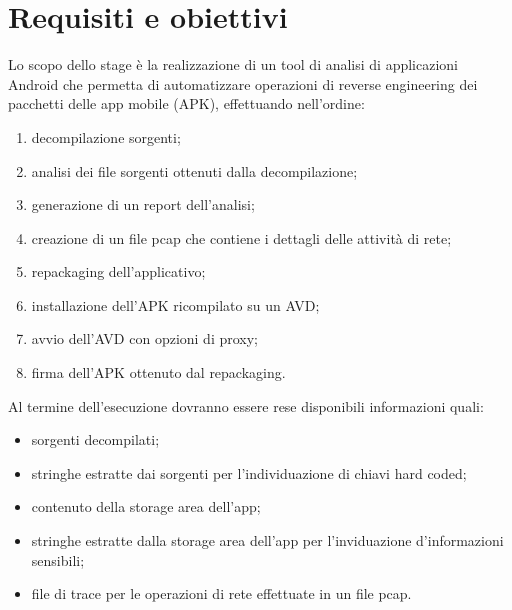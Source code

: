 
\section{Requisiti e obiettivi}\label{sec:requisiti-e-obiettivi}

Lo scopo dello stage è la realizzazione di un tool di analisi di applicazioni Android che permetta di automatizzare operazioni di reverse engineering dei pacchetti delle app mobile (APK), effettuando nell'ordine:
\begin{enumerate}
    \setlength\itemsep{0.1em}
    \item decompilazione sorgenti;
    \item analisi dei file sorgenti ottenuti dalla decompilazione;
    \item generazione di un report dell'analisi;
    \item creazione di un file \gls{pcap} che contiene i dettagli delle attività di rete;
    \item repackaging dell'applicativo;
    \item installazione dell'APK ricompilato su un AVD;
    \item avvio dell'AVD con opzioni di proxy;
    \item firma dell'APK ottenuto dal repackaging.
\end{enumerate}

Al termine dell'esecuzione dovranno essere rese disponibili informazioni quali:
\begin{itemize}
    \setlength\itemsep{0.1em}
    \item sorgenti decompilati;
    \item stringhe estratte dai sorgenti per l'individuazione di chiavi hard coded;
    \item contenuto della storage area dell'app;
    \item stringhe estratte dalla storage area dell'app per l'inviduazione d'informazioni sensibili;
    \item file di trace per le operazioni di rete effettuate in un file pcap.
\end{itemize}

